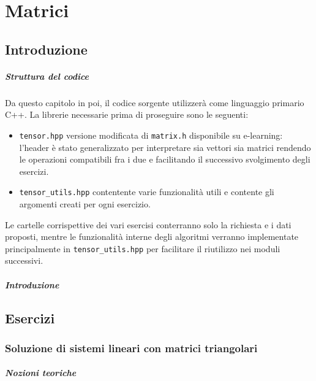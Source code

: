 \setchapterpreamble[u]{\margintoc}
\chapter{Matrici}

\section{Introduzione}

\paragraph{Struttura del codice}

Da questo capitolo in poi, il codice sorgente utilizzerà come linguaggio primario
C++. La librerie necessarie prima di proseguire sono le seguenti:

\begin{itemize}
	\item \texttt{tensor.hpp} versione modificata di \texttt{matrix.h} disponibile
	      su e-learning: l'header è stato generalizzato per interpretare sia
	      vettori sia matrici rendendo le operazioni compatibili fra i due e
	      facilitando il successivo svolgimento degli esercizi.
	\item \texttt{tensor\_utils.hpp} contentente varie funzionalità utili e contente
	      gli argomenti creati per ogni esercizio.
\end{itemize}

Le cartelle corrispettive dei vari esercisi conterranno solo la richiesta e i dati
proposti, mentre le funzionalità interne degli algoritmi verranno implementate
principalmente in \texttt{tensor\_utils.hpp} per facilitare il riutilizzo nei moduli
successivi.

\paragraph{Introduzione}

\section{Esercizi}

\subsection{Soluzione di sistemi lineari con matrici triangolari}

\paragraph{Nozioni teoriche}

